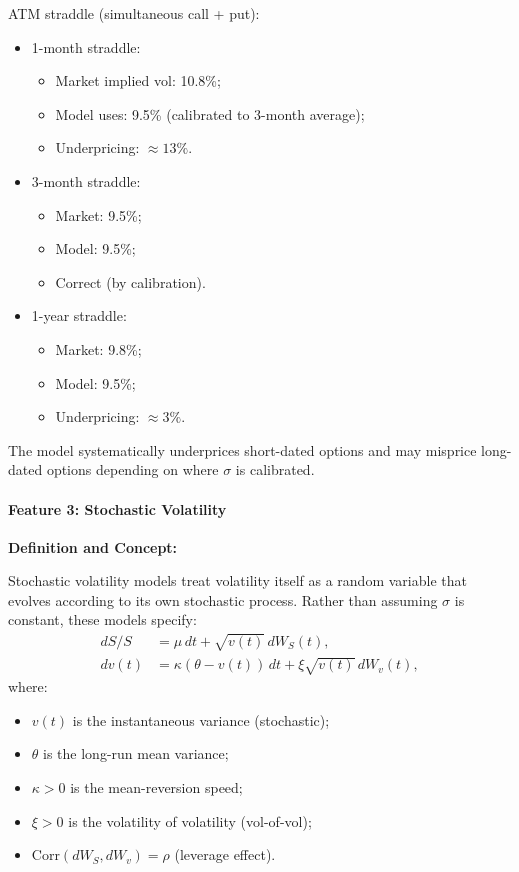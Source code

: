 ATM straddle (simultaneous call + put):
\begin{itemize}
	\item 1-month straddle:
	\begin{itemize}
		\item Market implied vol: 10.8\%;
		\item Model uses: 9.5\% (calibrated to 3-month average);
		\item Underpricing: $\approx 13\%$.
	\end{itemize}
	
	\item 3-month straddle:
	\begin{itemize}
		\item Market: 9.5\%;
		\item Model: 9.5\%;
		\item Correct (by calibration).
	\end{itemize}
	
	\item 1-year straddle:
	\begin{itemize}
		\item Market: 9.8\%;
		\item Model: 9.5\%;
		\item Underpricing: $\approx 3\%$.
	\end{itemize}
\end{itemize}

The model systematically underprices short-dated options and may misprice long-dated options depending on where $\sigma$ is calibrated.

\paragraph{Feature 3: Stochastic Volatility}

\textbf{Definition and Concept:}

Stochastic volatility models treat volatility itself as a random variable that evolves according to its own stochastic process. Rather than assuming $\sigma$ is constant, these models specify:
\begin{align}
	dS/S &= \mu \, dt + \sqrt{v(t)} \, dW_S(t), \\
	dv(t) &= \kappa(\theta - v(t)) \, dt + \xi \sqrt{v(t)} \, dW_v(t),
\end{align}
where:
\begin{itemize}
	\item $v(t)$ is the instantaneous variance (stochastic);
	\item $\theta$ is the long-run mean variance;
	\item $\kappa > 0$ is the mean-reversion speed;
	\item $\xi > 0$ is the volatility of volatility (vol-of-vol);
	\item $\text{Corr}(dW_S, dW_v) = \rho$ (leverage effect).
\end{itemize}

